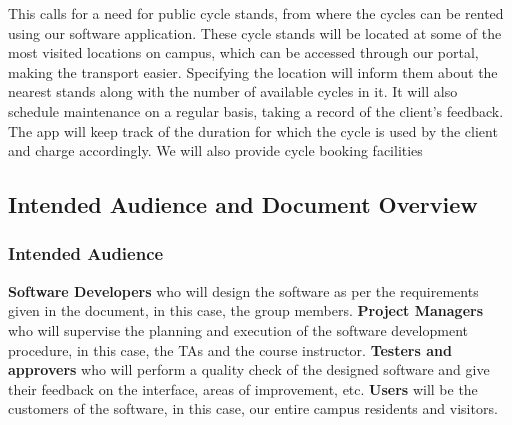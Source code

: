 \documentclass[11pt]{article}
\begin{document}
This calls for a need for public cycle stands, from where the cycles can be rented using our  software application. These cycle stands will be located at some of the most visited locations on campus, which can be accessed through our portal, making the transport easier. Specifying the location will inform them about the nearest stands along with the number of available cycles in it.
It will also schedule maintenance on a regular basis, taking a record of the client’s feedback. The app will keep track of the duration for which the cycle is used by the client and charge accordingly. We will also provide cycle booking facilities

\subsection{Intended Audience and Document Overview}
\subsubsection{Intended Audience}
\textbf{Software Developers} who will design the software as per the requirements given in the document, in this case, the group members. \textbf{Project Managers} who will supervise the planning and execution of the software development procedure, in this case, the TAs and the course instructor. \textbf{Testers and approvers} who will perform a quality check of the designed software and give their feedback on the interface, areas of improvement, etc. \textbf{Users} will be the customers of the software, in this case, our entire campus residents and visitors.
\end{document}

